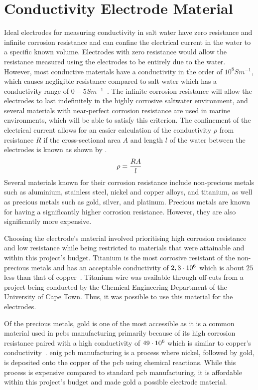\section{Conductivity Electrode Material}

Ideal electrodes for measuring conductivity in salt water have zero resistance and infinite corrosion resistance and can confine the electrical current in the water to a specific known volume.
Electrodes with zero resistance would allow the resistance measured using the electrodes to be entirely due to the water.
However, most conductive materials have a conductivity in the order of $10^8 Sm^{-1}$, which causes negligible resistance compared to salt water which has a conductivity range of $0-5 Sm^{-1}$~\cite{as_typical_conductivity_2022}.
The infinite corrosion resistance will allow the electrodes to last indefinitely in the highly corrosive saltwater environment, and several materials with near-perfect corrosion resistance are used in marine environments, which will be able to satisfy this criterion.
The confinement of the electrical current allows for an easier calculation of the conductivity $\rho$ from resistance $R$ if the cross-sectional area $A$ and length $l$ of the water between the electrodes is known as shown by .
\begin{equation}
    \rho = \frac{\displaystyle RA}{\displaystyle l}
    \label{eqn:conductivity-from-resistance}
\end{equation}
Several materials known for their corrosion resistance include non-precious metals such as aluminium, stainless steel, nickel and copper alloys, and titanium, as well as precious metals such as gold, silver, and platinum.
Precious metals are known for having a significantly higher corrosion resistance. 
However, they are also significantly more expensive.

Choosing the electrode's material involved prioritising high corrosion resistance and low resistance while being restricted to materials that were attainable and within this project's budget.
Titanium is the most corrosive resistant of the non-precious metals and has an acceptable conductivity of $2,3\cdot10^{6}$ which is about $25$ less than that of copper~\cite{walsh_electrodes_conductivity_1991}.
Titanium wire was available through off-cuts from a project being conducted by the Chemical Engineering Department of the University of Cape Town. 
Thus, it was possible to use this material for the electrodes.

Of the precious metals, gold is one of the most accessible as it is a common material used in \glspl{pcb} manufacturing primarily because of its high corrosion resistance paired with a high conductivity of $49\cdot10^{6}$ which is similar to copper's conductivity~\cite{walsh_electrodes_conductivity_1991}.
\gls{enig} \gls{pcb} manufacturing is a process where nickel, followed by gold, is deposited onto the copper of the \gls{pcb} using chemical reactions.
While this process is expensive compared to standard \gls{pcb} manufacturing, it is affordable within this project's budget and made gold a possible electrode material.

